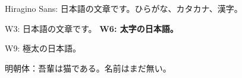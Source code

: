 \documentclass{article}
\begin{document}
{\hira Hiragino Sans: 日本語の文章です。ひらがな、カタカナ、漢字。}

{\hiraW W3: 日本語の文章です。 \textbf{W6: 太字の日本語。}}

{\hiraNine W9: 極太の日本語。}

{\mincho 明朝体：吾輩は猫である。名前はまだ無い。}
\end{document}
